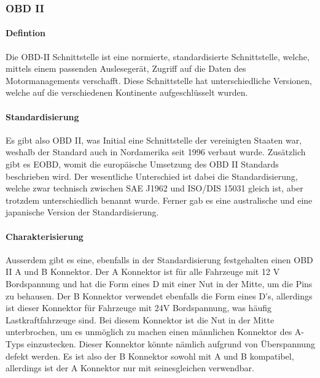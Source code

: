 \subsubsection{OBD II}
\paragraph{Defintion}
Die OBD-II Schnittstelle ist eine normierte, standardisierte Schnittstelle, welche, mittels einem passenden Auslesegerät, Zugriff auf die Daten des Motormanagements verschafft. Diese Schnittstelle hat unterschiedliche Versionen, welche auf die verschiedenen Kontinente aufgeschlüsselt wurden. 
\paragraph{Standardisierung}
Es gibt also OBD II, was Initial eine Schnittstelle der vereinigten Staaten war, weshalb der Standard auch in Nordamerika seit 1996 verbaut wurde. Zusätzlich gibt es EOBD, womit die europäische Umsetzung des OBD II Standards beschrieben wird.\cite{Directive.98/69/EC.EUParliament} Der wesentliche Unterschied ist dabei die Standardisierung, welche zwar technisch zwischen SAE J1962 und ISO/DIS 15031 gleich ist, aber trotzdem unterschiedlich benannt wurde. \cite{SAE.J1962} Ferner gab es eine australische \cite{AU.Motor.Vehicle.Standards.Act.1989} und eine japanische Version der Standardisierung.
\paragraph{Charakterisierung}
Ausserdem gibt es eine, ebenfalls in der Standardisierung festgehalten einen OBD II A und B Konnektor. Der A Konnektor ist für alle Fahrzeuge mit 12 V Bordspannung und hat die Form eines D mit einer Nut in der Mitte, um die Pins zu behausen. Der B Konnektor verwendet ebenfalls die Form eines D's, allerdings ist dieser Konnektor für Fahrzeuge mit 24V Bordspannung, was häufig Lastkraftfahrzeuge sind. Bei diesem Konnektor ist die Nut in der Mitte unterbrochen, um es unmöglich zu machen einen männlichen Konnektor des A-Typs einzustecken. Dieser Konnektor könnte  nämlich aufgrund von Überspannung defekt werden. Es ist also der B Konnektor sowohl mit A und B kompatibel, allerdings ist der A Konnektor nur mit seinesgleichen verwendbar.


